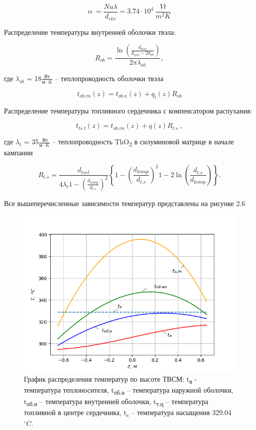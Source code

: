\[\alpha\  = \frac{Nu\lambda}{d_{ekv}} = 3.74 \cdot 10^{4}\ \frac{Vt}{m^{2}K}\]

Распределение температуры внутренней оболочки твэла:

\[R_{ob} = \frac{\ln\left( \frac{d_{tvel}}{d_{tvel} - 2\delta_{ob}} \right)}{2\pi\lambda_{ob}},\]

где $\lambda_{ob}$ = 18$\frac{\textrm{Вт}}{\textrm{м} \cdot K}$ -- теплопроводность
оболочки твэла

\[t_{ob.vn}\left( z \right) = t_{ob.n}\left( z \right) + q_{l}\left( z \right)R_{ob}\]


Распределение температуры топливного сердечника с компенсатором
распухания:

\[t_{ts.t}\left( z \right) = t_{ob.vn}\left( z \right) + q\left( z \right)R_{t.s}\ ,\]

где $\lambda_{t}$ = 35$\frac{\textrm{ Вт}}{\textrm{м} \cdot K}$ -- теплопроводность
ThO\textsubscript{2} в силуминовой матрице в начале кампании

\[R_{t.s} = \frac{d_{tvel}}{4\lambda_{t} 1 - \left( \frac{d_{komp}}{d_{t.s}} \right)^{2} }\left\{ 1 - \left( \frac{d_{komp}}{d_{t.s}} \right)^{2} 1 - 2\ln\left( \frac{d_{t.s}}{d_{komp}} \right)  \right\}.\]

Все вышеперечисленные зависимости температур представлены на рисунке 2.6

\begin{figure}[!h]
\center
\includegraphics[width=6in]{media/image10.png}
\caption{График распределения температур по высоте ТВСМ:
t­\textsubscript{в} - температура теплоносителя, t­\textsubscript{об.н}
-- температура наружной оболочки, t­\textsubscript{об.н} -- температура
внутренней оболочки, t­\textsubscript{т.ц} -- температура топливной в
центре сердечника, t­\textsubscript{s} -- температура насыщения 329.04
$^\circ C$.}
\end{figure}

